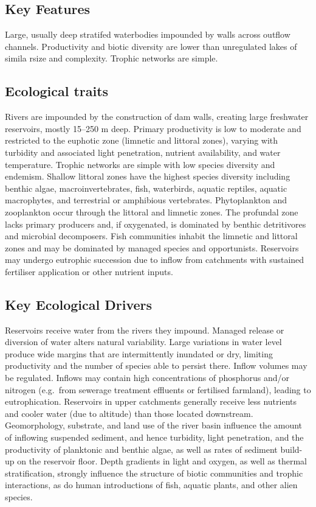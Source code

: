 \documentclass[
  letterpaper,
  DIV=11,
  numbers=noendperiod]{scrartcl}
\begin{document}
\subsection{Key Features}\label{key-features-17}

Large, usually deep stratifed waterbodies impounded by walls across
outflow channels. Productivity and biotic diversity are lower than
unregulated lakes of simila rsize and complexity. Trophic networks are
simple.

\subsection{Ecological traits}\label{ecological-traits-17}

Rivers are impounded by the construction of dam walls, creating large
freshwater reservoirs, mostly 15--250 m deep. Primary productivity is
low to moderate and restricted to the euphotic zone (limnetic and
littoral zones), varying with turbidity and associated light
penetration, nutrient availability, and water temperature. Trophic
networks are simple with low species diversity and endemism. Shallow
littoral zones have the highest species diversity including benthic
algae, macroinvertebrates, fish, waterbirds, aquatic reptiles, aquatic
macrophytes, and terrestrial or amphibious vertebrates. Phytoplankton
and zooplankton occur through the littoral and limnetic zones. The
profundal zone lacks primary producers and, if oxygenated, is dominated
by benthic detritivores and microbial decomposers. Fish communities
inhabit the limnetic and littoral zones and may be dominated by managed
species and opportunists. Reservoirs may undergo eutrophic succession
due to inflow from catchments with sustained fertiliser application or
other nutrient inputs.

\subsection{Key Ecological Drivers}\label{key-ecological-drivers-17}

Reservoirs receive water from the rivers they impound. Managed release
or diversion of water alters natural variability. Large variations in
water level produce wide margins that are intermittently inundated or
dry, limiting productivity and the number of species able to persist
there. Inflow volumes may be regulated. Inflows may contain high
concentrations of phosphorus and/or nitrogen (e.g.~from sewerage
treatment effluents or fertilised farmland), leading to eutrophication.
Reservoirs in upper catchments generally receive less nutrients and
cooler water (due to altitude) than those located downstream.
Geomorphology, substrate, and land use of the river basin influence the
amount of inflowing suspended sediment, and hence turbidity, light
penetration, and the productivity of planktonic and benthic algae, as
well as rates of sediment build-up on the reservoir floor. Depth
gradients in light and oxygen, as well as thermal stratification,
strongly influence the structure of biotic communities and trophic
interactions, as do human introductions of fish, aquatic plants, and
other alien species.
\end{document}
